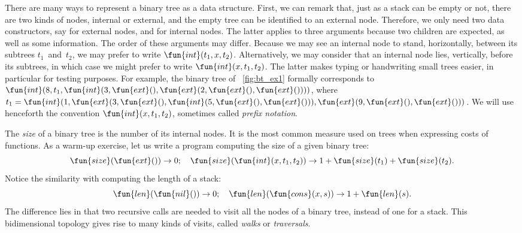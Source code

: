 There are many ways to represent a binary tree as a data
structure. First, we can remark that, just as a stack can be empty or
not, there are two kinds of nodes, internal or external, and the empty
tree can be identified to an external node. Therefore, we only need
two data constructors, say  for
external nodes, and  for internal
nodes. The latter applies to three arguments because two children are
expected, as well as some information. The order of these arguments
may differ. Because we may see an internal node to stand,
horizontally, between its subtrees \(t_1\)~and~\(t_2\), we may prefer
to write \(\fun{int}(t_1,x,t_2)\). Alternatively, we may consider
that an internal node lies, vertically, before its subtrees, in which
case we might prefer to write \(\fun{int}(x,t_1,t_2)\). The latter
makes typing or handwriting small trees easier, in particular for
testing purposes. For example, the binary tree of
\fig~\vref{fig:bt_ex1} formally corresponds to \(\fun{int}(8, t_1,
\fun{int}(3, \fun{ext}(), \fun{ext}(2, \fun{ext}(), \fun{ext}())))\),
where \(t_1=\fun{int}(1, \fun{ext}(3, \fun{ext}(), \fun{int}(5,
\fun{ext}(), \fun{ext}())), \fun{ext}(9, \fun{ext}(),
\fun{ext}()))\). We will use henceforth the convention
\(\fun{int}(x,t_1,t_2)\), sometimes called \emph{prefix
notation}.

The \emph{size} of a binary tree is the number
of its internal nodes. It is the most common measure used on trees
when expressing costs of functions. As a warm\hyp{}up exercise, let us
write a program computing the size of a given binary tree:
\begin{equation}
\fun{size}(\fun{ext}()) \rightarrow 0;\quad
\fun{size}(\fun{int}(x,t_1,t_2))
  \rightarrow 1 + \fun{size}(t_1) + \fun{size}(t_2).
\index{size@\fun{size/1}}
\label{eq:size}
\end{equation}
Notice the similarity with computing the length of a stack:
\begin{equation*}
\fun{len}(\fun{nil}()) \rightarrow 0;\quad
\fun{len}(\fun{cons}(x,s)) \rightarrow 1 + \fun{len}(s).
\index{len@\fun{len/1}}
\index{nil@\fun{nil/0}}
\index{cons@\fun{cons/2}}
\end{equation*}
The difference lies in that two recursive calls are needed to visit
all the nodes of a binary tree, instead of one for a stack. This
bidimensional topology gives rise to many kinds of visits, called
\emph{walks} or \emph{traversals}.

